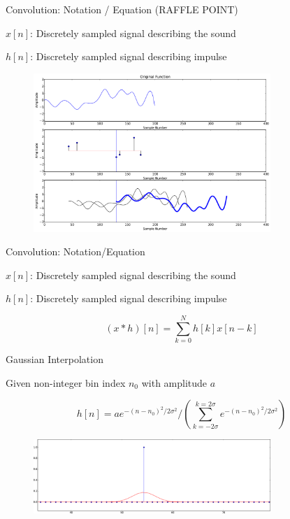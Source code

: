 \documentclass{beamer}
\begin{document}
\begin{frame}{Convolution: Notation / Equation (RAFFLE POINT)}

$x[n]$: Discretely sampled signal describing the sound

$h[n]$: Discretely sampled signal describing impulse

\begin{figure}[t]
	\centering
    \includegraphics[width=0.8\textwidth]{Conv2.pdf}
\end{figure}

\end{frame}

\begin{frame}{Convolution: Notation/Equation}

$x[n]$: Discretely sampled signal describing the sound

$h[n]$: Discretely sampled signal describing impulse

\[ (x*h)[n] = \sum_{k=0}^N h[k]x[n-k] \]


\end{frame}

\begin{frame}{Gaussian Interpolation}

Given non-integer bin index $n_0$ with amplitude $a$

\[ h[n] = a e^{-(n-n_0)^2/2\sigma^2} / \left(\sum_{k = -2\sigma}^{k=2\sigma} e^{-(n-n_0)^2/2\sigma^2} \right) \]

\begin{figure}[t]
	\centering
    \includegraphics[width=0.8\textwidth]{GaussInterp.pdf}
\end{figure}


\end{frame}
\end{document}
